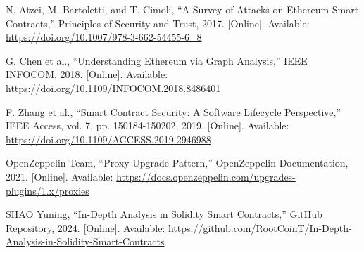 \documentclass[conference]{IEEEtran}
\begin{document}
\begin{thebibliography}{2}
    N. Atzei, M. Bartoletti, and T. Cimoli,
    ``A Survey of Attacks on Ethereum Smart Contracts,''
    Principles of Security and Trust,
    2017.
    [Online].
    Available: \url{https://doi.org/10.1007/978-3-662-54455-6_8}

    G. Chen et al.,
    ``Understanding Ethereum via Graph Analysis,''
    IEEE INFOCOM,
    2018.
    [Online].
    Available: \url{https://doi.org/10.1109/INFOCOM.2018.8486401}

    F. Zhang et al.,
    ``Smart Contract Security: A Software Lifecycle Perspective,''
    IEEE Access,
    vol. 7,
    pp. 150184-150202,
    2019.
    [Online].
    Available: \url{https://doi.org/10.1109/ACCESS.2019.2946988}

    OpenZeppelin Team,
    ``Proxy Upgrade Pattern,''
    OpenZeppelin Documentation,
    2021.
    [Online].
    Available: \url{https://docs.openzeppelin.com/upgrades-plugins/1.x/proxies}

    SHAO Yuning,
    ``In-Depth Analysis in Solidity Smart Contracts,''
    GitHub Repository,
    2024.
    [Online].
    Available: \url{https://github.com/RootCoinT/In-Depth-Analysis-in-Solidity-Smart-Contracts}
    
\end{thebibliography}
\end{document}
